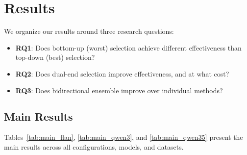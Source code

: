 \section{Results}
\label{sec:results}

We organize our results around three research questions:
\begin{itemize}[leftmargin=*]
\item \textbf{RQ1}: Does bottom-up (worst) selection achieve different effectiveness than top-down (best) selection?
\item \textbf{RQ2}: Does dual-end selection improve effectiveness, and at what cost?
\item \textbf{RQ3}: Does bidirectional ensemble improve over individual methods?
\end{itemize}

\subsection{Main Results}

Tables~\ref{tab:main_flan}, \ref{tab:main_qwen3}, and \ref{tab:main_qwen35} present the main results across all configurations, models, and datasets.

